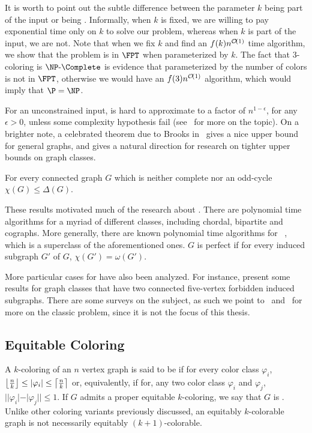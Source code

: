 It is worth to point out the subtle difference between the parameter $k$ being part of the input or being .
Informally, when $k$ is fixed, we are willing to pay exponential time only on $k$ to solve our problem, whereas when $k$ is part of the input, we are not.
Note that when we fix $k$ and find an $f(k)n^{\mathcal{O}\!\left(1\right)}$ time algorithm, we show that the problem is in $\FPT$ when parameterized by $k$.
The fact that $3$-coloring is $\NPc$ is evidence that  parameterized by the number of colors is not in $\FPT$, otherwise we would have an $f(3)n^{\mathcal{O}\!\left(1\right)}$ algorithm, which would imply that $\P = \NP$. 

For an unconstrained input,  is hard to approximate to a factor of $n^{1-\epsilon}$, for any $\epsilon > 0$, unless some complexity hypothesis fail (see~\citep{color_zpp} for more on the topic).
On a brighter note, a celebrated theorem due to Brooks in~\citep{brooks_theorem} gives a nice upper bound for general graphs, and gives a natural direction for research on tighter upper bounds on graph classes.

\begin{theorem*}
    For every connected graph $G$ which is neither complete nor an odd-cycle $\chi(G) \leq \Delta(G)$.
\end{theorem*}

These results motivated much of the research about .
There are polynomial time algorithms for a myriad of different classes, including chordal, bipartite and cographs.
More generally, there are known polynomial time algorithms for ~\citep{perfect_polynomial}, which is a superclass of the aforementioned ones.
$G$ is perfect if for every induced subgraph $G'$ of $G$, $\chi(G') = \omega(G')$.

More particular cases for  have also been analyzed. For instance, \cite{coloring_art} present some results for graph classes that have two connected five-vertex forbidden induced subgraphs. There are some surveys on the subject, as such we point to~\citep{coloring_survey} and~\citep{coloring_survey2} for more on the classic  problem, since it is not the focus of this thesis.


\subsection{Equitable Coloring}
A $k$-coloring of an $n$ vertex graph is said to be  if for every color class $\varphi_i$, $\left\lfloor\frac{n}{k}\right\rfloor \leq |\varphi_i| \leq \left\lceil\frac{n}{k}\right\rceil$ or, equivalently, if for, any two color class $\varphi_i$ and $\varphi_j$, $||\varphi_i| - |\varphi_j|| \leq 1$.
If $G$ admits a proper equitable $k$-coloring, we say that $G$ is .
Unlike other coloring variants previously discussed, an equitably $k$-colorable graph is not necessarily equitably $(k+1)$-colorable.

